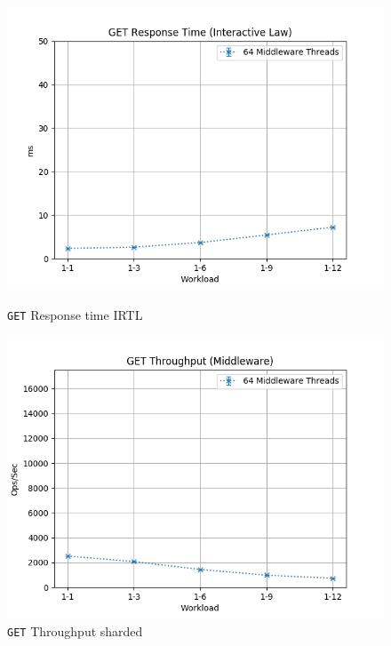 \documentclass[11pt,a4paper]{article}
\begin{document}
\begin{figure}[H]
	\centering
	\captionsetup{width=0.4\textwidth}
    \begin{minipage}{0.5\textwidth}
        \includegraphics[width=\textwidth]{../illustrations/plots/4_1_full_system_read_sharded/64/middleware_interactive_get_rt_ms.png}
        \caption{\texttt{GET} Response time IRTL}
        \label{fig:full_system_read_sharded_mw_rt_it}
    \end{minipage}\hfill
    \begin{minipage}{0.5\textwidth}
        \centering
        \includegraphics[width=\textwidth]{../illustrations/plots/4_1_full_system_read_sharded/64/middleware_get_tp_s.png}
        \caption{\texttt{GET} Throughput sharded}
        \label{fig:full_system_read_sharded_mw_tp}
    \end{minipage}
\end{figure}
\end{document}
